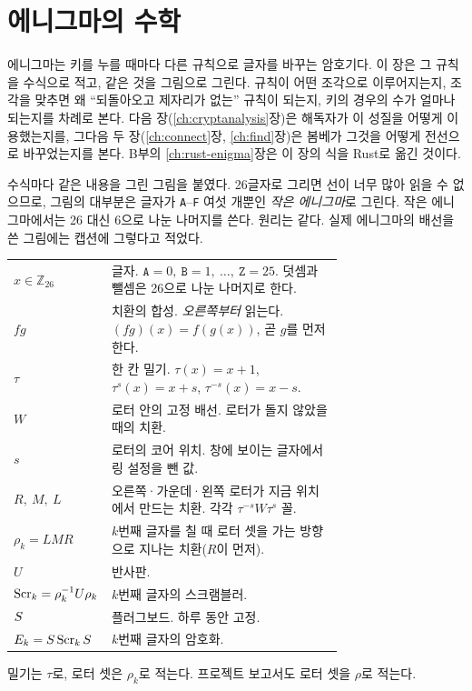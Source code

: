 \chapter{에니그마의 수학}\label{ch:enigma-math}

\newcommand{\amL}[1]{\mathtt{#1}}        %
\newcommand{\amcyc}[1]{(\mathtt{#1})}    %

에니그마는 키를 누를 때마다 다른 규칙으로 글자를 바꾸는 암호기다. 이 장은 그 규칙을 수식으로 적고, 같은 것을
그림으로 그린다. 규칙이 어떤 조각으로 이루어지는지, 조각을 맞추면 왜 ``되돌아오고 제자리가 없는'' 규칙이
되는지, 키의 경우의 수가 얼마나 되는지를 차례로 본다. 다음 장(\ref{ch:cryptanalysis}장)은 해독자가 이 성질을
어떻게 이용했는지를, 그다음 두 장(\ref{ch:connect}장, \ref{ch:find}장)은 봄베가 그것을 어떻게 전선으로
바꾸었는지를 본다. B부의 \ref{ch:rust-enigma}장은 이 장의 식을 Rust로 옮긴 것이다.

수식마다 같은 내용을 그린 그림을 붙였다. 26글자로 그리면 선이 너무 많아 읽을 수 없으므로, 그림의 대부분은
글자가 \texttt{A}--\texttt{F} 여섯 개뿐인 \emph{작은 에니그마}로 그린다. 작은 에니그마에서는 26 대신 6으로 나눈
나머지를 쓴다. 원리는 같다. 실제 에니그마의 배선을 쓴 그림에는 캡션에 그렇다고 적었다.

\begin{keybox}[title={이 장의 기호}]
\small
\begin{tabular}{@{}l@{\quad}p{0.72\linewidth}@{}}
$x \in \mathbb{Z}_{26}$ & 글자. $\amL{A}=0,\ \amL{B}=1,\ \ldots,\ \amL{Z}=25$. 덧셈과 뺄셈은 26으로 나눈 나머지로 한다. \\
$fg$ & 치환의 합성. \emph{오른쪽부터} 읽는다. $(fg)(x) = f(g(x))$, 곧 $g$를 먼저 한다. \\
$\tau$ & 한 칸 밀기. $\tau(x) = x+1$, $\tau^{s}(x) = x+s$, $\tau^{-s}(x) = x-s$. \\
$W$ & 로터 안의 고정 배선. 로터가 돌지 않았을 때의 치환. \\
$s$ & 로터의 코어 위치. 창에 보이는 글자에서 링 설정을 뺀 값. \\
$R,\ M,\ L$ & 오른쪽·가운데·왼쪽 로터가 지금 위치에서 만드는 치환. 각각 $\tau^{-s}W\tau^{s}$ 꼴. \\
$\rho_k = LMR$ & $k$번째 글자를 칠 때 로터 셋을 가는 방향으로 지나는 치환($R$이 먼저). \\
$U$ & 반사판. \\
$\mathrm{Scr}_k = \rho_k^{-1}U\rho_k$ & $k$번째 글자의 스크램블러. \\
$S$ & 플러그보드. 하루 동안 고정. \\
$E_k = S\,\mathrm{Scr}_k\,S$ & $k$번째 글자의 암호화. \\
\end{tabular}

밀기는 $\tau$로, 로터 셋은 $\rho_k$로 적는다. 프로젝트 보고서도 로터 셋을 $\rho$로 적는다.
\end{keybox}

